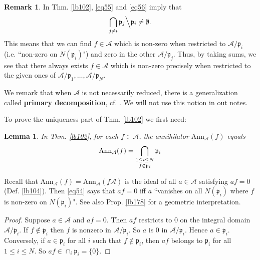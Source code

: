 \documentclass[12pt,b5paper,notitlepage]{report}
\theoremstyle{definition}
\newtheorem{rem}[df]{Remark}
\theoremstyle{plain}
\newtheorem{lm}[df]{Lemma}
\newcommand{\mc}{\mathcal}
\newcommand{\pk}{\mathfrak p}
\newcommand{\Ann}{\mathrm{Ann}}
\numberwithin{equation}{section}
\begin{document}
\begin{rem}\label{lb106}
In Thm. \ref{lb102}, \eqref{eq55} and \eqref{eq56} imply that
\begin{align*}
\bigcap_{j\neq i}\pk_j\Big\backslash\pk_i\neq\emptyset.
\end{align*}
This means that we can find $f\in \mc A$ which is non-zero when restricted to $\mc A/\pk_i$ (i.e. ``non-zero on $N(\pk_i)$") and zero in the other $\mc A/\pk_j$. Thus, by taking sums, we see that there always exists $f\in \mc A$ which is non-zero precisely when restricted to the given ones of $\mc A/\pk_1,\dots,\mc A/\pk_N$. 
\end{rem}


We remark that when $\mc A$ is not necessarily reduced, there is a generalization called \textbf{primary decomposition}, cf. \cite{AM}. We will not use this notion in out notes.


To prove the uniqueness part of Thm. \ref{lb102} we first need:

\begin{lm}\label{lb107}
In Thm. \ref{lb102}, for each $f\in \mc A$, the annihilator $\Ann_{\mc A}(f)$ equals
\begin{align}\label{eq54}
\Ann_{\mc A}(f)=\bigcap_{
\begin{subarray}{c}
1\leq i\leq N\\[0.2ex]
f\notin\pk_i
\end{subarray}
} \pk_i
\end{align}
\end{lm}

Recall that $\Ann_{\mc A}(f)=\Ann_{\mc A}(f\mc A)$ is the ideal of all $a\in \mc A$ satisfying $af=0$ (Def. \ref{lb104}). Then \eqref{eq54} says that $af=0$ iff $a$ ``vanishes on all $N(\pk_i)$ where $f$ is non-zero on $N(\pk_i)$". See also Prop. \ref{lb178} for a geometric interpretation.





\begin{proof}
Suppose $a\in \mc A$ and $af=0$. Then $af$ restricts to $0$ on the integral domain $\mc A/\pk_i$. If $f\notin \pk_i$ then $f$ is nonzero in $\mc A/\pk_i$. So $a$ is $0$ in $\mc A/\pk_i$. Hence $a\in\pk_i$. Conversely, if $a\in\pk_i$ for all $i$ such that $f\notin\pk_i$, then $af$ belongs to $\pk_i$ for all $1\leq i\leq N$. So $af\in\cap_i\pk_i=\{0\}$.
\end{proof}
\end{document}
